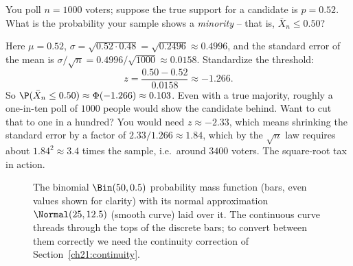 \begin{example}[A poll]
\label{ch21:ex-poll}
You poll $n = 1000$ voters; suppose the true support for a candidate is $p = 0.52$. What
is the probability your sample shows a \emph{minority} -- that is, $\bar X_n \le 0.50$?

Here $\mu = 0.52$, $\sigma = \sqrt{0.52 \cdot 0.48} = \sqrt{0.2496} \approx 0.4996$, and
the standard error of the mean is $\sigma/\sqrt n = 0.4996/\sqrt{1000} \approx 0.0158$.
Standardize the threshold:
\[
  z = \frac{0.50 - 0.52}{0.0158} \approx -1.266.
\]
So $\P(\bar X_n \le 0.50) \approx \Phi(-1.266) \approx 0.103$. Even with a true majority,
roughly a one-in-ten poll of $1000$ people would show the candidate behind. Want to cut
that to one in a hundred? You would need $z \approx -2.33$, which means shrinking the
standard error by a factor of $2.33/1.266 \approx 1.84$, which by the $\sqrt n$ law
requires about $1.84^2 \approx 3.4$ times the sample, i.e.\ around $3400$ voters. The
square-root tax in action.
\end{example}

\begin{figure}[H]
\centering
{}
\caption{The binomial $\Bin(50, 0.5)$ probability mass function (bars, even values
shown for clarity) with its normal approximation $\Normal(25, 12.5)$ (smooth curve) laid
over it. The continuous curve threads through the tops of the discrete bars; to convert
between them correctly we need the continuity correction of
Section~\ref{ch21:continuity}.}
\label{ch21:fig-binom}
\end{figure}

